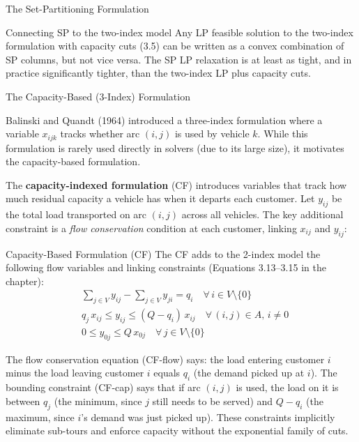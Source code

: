 \documentclass[aspectratio=169,10pt]{beamer}
\begin{document}
\begin{frame}[allowframebreaks]{The Set-Partitioning Formulation}
\begin{block}{Connecting SP to the two-index model}
Any LP feasible solution to the two-index formulation with capacity cuts
(3.5) can be written as a convex combination of SP columns, but not vice
versa. The SP LP relaxation is at least as tight, and in practice
significantly tighter, than the two-index LP plus capacity cuts.
\end{block}

\end{frame}

\begin{frame}[allowframebreaks]{The Capacity-Based (3-Index) Formulation}

Balinski and Quandt (1964) introduced a three-index formulation where a
variable $x_{ijk}$ tracks whether arc $(i,j)$ is used by vehicle $k$.
While this formulation is rarely used directly in solvers (due to its
large size), it motivates the capacity-based formulation.

The \textbf{capacity-indexed formulation} (CF) introduces variables that
track how much residual capacity a vehicle has when it departs each
customer. Let $y_{ij}$ be the total load transported on arc $(i,j)$
across all vehicles. The key additional constraint is a \emph{flow
conservation} condition at each customer, linking $x_{ij}$ and $y_{ij}$:

\begin{block}{Capacity-Based Formulation (CF)}
The CF adds to the 2-index model the following flow variables and
linking constraints (Equations 3.13--3.15 in the chapter):
\begin{align}
  & \sum_{j \in V} y_{ij} - \sum_{j \in V} y_{ji} = q_i
    \quad \forall\, i \in V \setminus \{0\} \tag{CF-flow}\\
  & q_j\, x_{ij} \leq y_{ij} \leq (Q - q_i)\, x_{ij}
    \quad \forall\, (i,j) \in A,\, i \neq 0 \tag{CF-cap}\\
  & 0 \leq y_{0j} \leq Q\, x_{0j}
    \quad \forall\, j \in V \setminus \{0\} \tag{CF-dep}
\end{align}
\end{block}

The flow conservation equation (CF-flow) says: the load entering customer
$i$ minus the load leaving customer $i$ equals $q_i$ (the demand picked
up at $i$). The bounding constraint (CF-cap) says that if arc $(i,j)$ is
used, the load on it is between $q_j$ (the minimum, since $j$ still needs
to be served) and $Q - q_i$ (the maximum, since $i$'s demand was just
picked up). These constraints implicitly eliminate sub-tours and enforce
capacity without the exponential family of cuts.

\end{frame}
\end{document}

